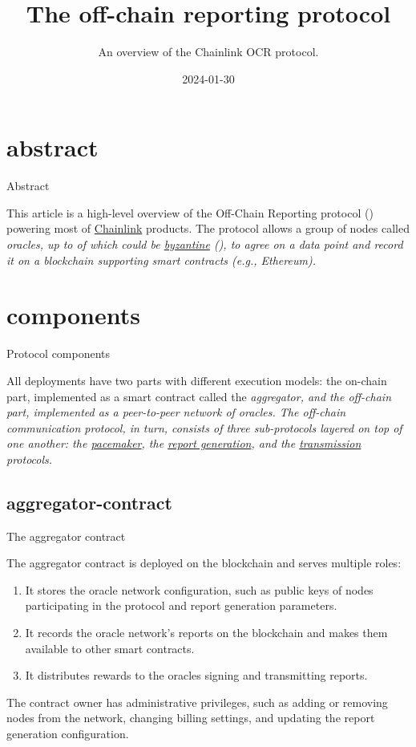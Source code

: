 \documentclass{article}
\title{The off-chain reporting protocol}
\subtitle{An overview of the Chainlink OCR protocol.}
\date{2024-01-30}
\begin{document}
\section{abstract}{Abstract}

This article is a high-level overview of the Off-Chain Reporting protocol () powering most of \href{https://chain.link/}{Chainlink} products.
The protocol allows a group of  nodes called \em{oracles}, up to  of which could be \href{https://en.wikipedia.org/wiki/Byzantine_fault}{byzantine} (), to agree on a data point and record it on a blockchain supporting smart contracts (e.g., Ethereum).

\section{components}{Protocol components}

All  deployments have two parts with different execution models: the on-chain part, implemented as a smart contract called the \em{aggregator}, and the off-chain part, implemented as a peer-to-peer network of oracles.
The off-chain communication protocol, in turn, consists of three sub-protocols layered on top of one another: the \href{#pacemaker}{pacemaker}, the \href{#report-generation}{report generation}, and the \href{#transmission}{transmission} protocols. 

\subsection{aggregator-contract}{The aggregator contract}

The aggregator contract is deployed on the blockchain and serves multiple roles:
\begin{enumerate}
    \item It stores the oracle network configuration, such as public keys of nodes participating in the protocol and report generation parameters.
    \item It records the oracle network's reports on the blockchain and makes them available to other smart contracts.
    \item It distributes rewards to the oracles signing and transmitting reports.
\end{enumerate}

The contract owner has administrative privileges, such as adding or removing nodes from the network, changing billing settings, and updating the report generation configuration.
\end{document}
